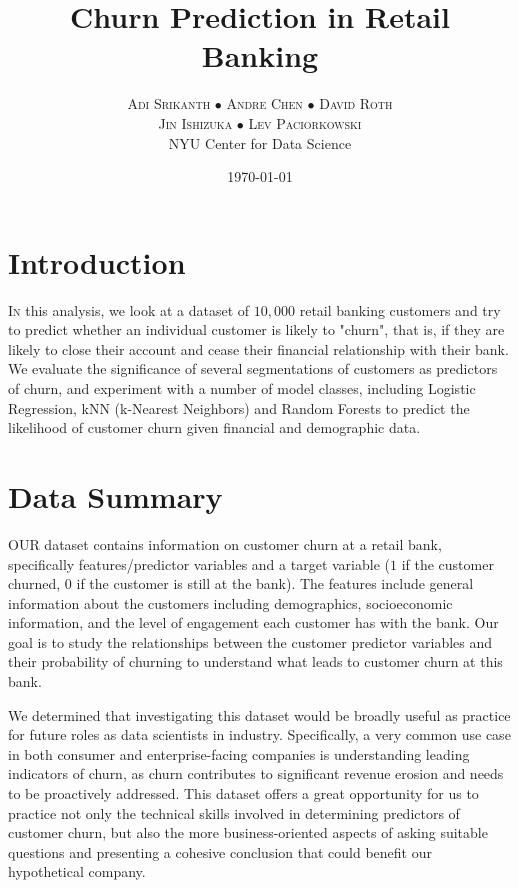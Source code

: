 \documentclass[twoside,twocolumn]{article}
\title{Churn Prediction in Retail Banking} %
\author{%
\textsc{Adi Srikanth $\bullet$ Andre Chen $\bullet$ David Roth} \\[1ex] %
\textsc{Jin Ishizuka $\bullet$ Lev Paciorkowski} \\[1ex] %
\normalsize NYU Center for Data Science \\ %
}
\date{\today} %
\begin{document}
\maketitle

\section{Introduction}

\lettrine[nindent=0em,lines=2]{I} n this analysis, we look at a dataset of $10,000$ retail banking customers and try to predict whether an individual customer is likely to "churn", that is, if they are likely to close their account and cease their financial relationship with their bank. We evaluate the significance of several segmentations of customers as predictors of churn, and experiment with a number of model classes, including Logistic Regression, kNN (k-Nearest Neighbors) and Random Forests to predict the likelihood of customer churn given financial and demographic data.

\section{Data Summary}

\lettrine[nindent=0em,lines=2]{O}UR dataset contains information on customer churn at a retail bank, specifically features/predictor variables and a target variable ($1$ if the customer churned, $0$ if the customer is still at the bank). The features include general information about the customers including demographics, socioeconomic information, and the level of engagement each customer has with the bank. Our goal is to study the relationships between the customer predictor variables and their probability of churning to understand what leads to customer churn at this bank.
    
We determined that investigating this dataset would be broadly useful as practice for future roles as data scientists in industry. Specifically, a very common use case in both consumer and enterprise-facing companies is understanding leading indicators of churn, as churn contributes to significant revenue erosion and needs to be proactively addressed. This dataset offers a great opportunity for us to practice not only the technical skills involved in determining predictors of customer churn, but also the more business-oriented aspects of asking suitable questions and presenting a cohesive conclusion that could benefit our hypothetical company.
\end{document}
